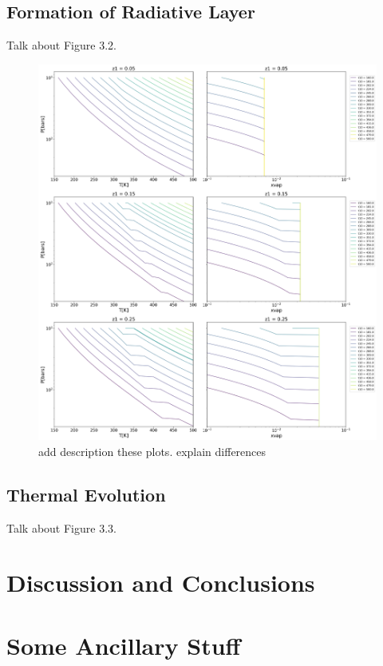 \documentclass[11pt]{ucscthesisbs}
\begin{document}
\section{Formation of Radiative Layer}
Talk about Figure 3.2.
\begin{figure}[ht!]
 \centerline{
  \includegraphics[width=7.0in]{figures/static_radiative_layer_plots_without_grid_points.png}
 }
\caption[Inhibition of convection on Neptune]
{add description these plots. explain differences}
\label{fig:radiative}
\end{figure}


\section{Thermal Evolution}
Talk about Figure 3.3.



\chapter{Discussion and Conclusions}





\appendix
\chapter{Some Ancillary Stuff}

\newcommand{\newblock}{}

\end{document}
